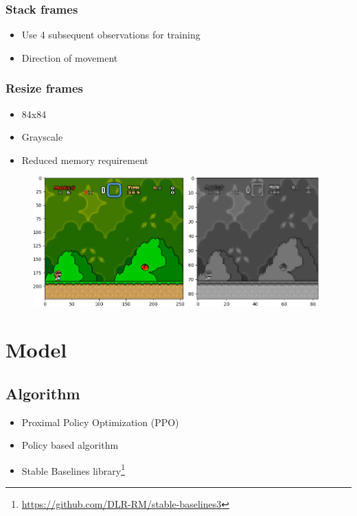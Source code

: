 \documentclass{article}
\begin{document}
    \subsubsection*{Stack frames}
    \begin{itemize}
        \item Use 4 subsequent observations for training
        \item Direction of movement
    \end{itemize}
    \subsubsection*{Resize frames}
    \begin{itemize}
        \item 84x84
        \item Grayscale
        \item Reduced memory requirement
    \end{itemize}
    \begin{figure}[H]
        \centering
        \includegraphics[height=5cm]{original}\hfill
        \includegraphics[height=5cm]{scaled}
    \end{figure}

    \section{Model}
    \subsection{Algorithm}
    \begin{itemize}
        \item Proximal Policy Optimization (PPO)
        \item Policy based algorithm
        \item Stable Baselines library\footnote{\url{https://github.com/DLR-RM/stable-baselines3}}
    \end{itemize}
\end{document}
